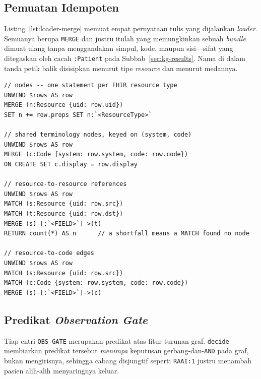 \subsection{Pemuatan Idempoten}
Listing~\ref{lst:loader-merge} memuat empat pernyataan tulis yang dijalankan
\emph{loader}. Semuanya berupa \texttt{MERGE} dan justru itulah yang memungkinkan sebuah
\emph{bundle} dimuat ulang tanpa menggandakan simpul, kode, maupun sisi---sifat yang
ditegaskan oleh cacah \texttt{:Patient} pada Subbab~\ref{sec:kg-results}. Nama di dalam
tanda petik balik disisipkan menurut tipe \emph{resource} dan menurut medannya.

\begin{lstlisting}[caption={Jalur tulis \emph{loader} (\texttt{loader.py}).},label={lst:loader-merge}]
// nodes -- one statement per FHIR resource type
UNWIND $rows AS row
MERGE (n:Resource {uid: row.uid})
SET n += row.props SET n:`<ResourceType>`

// shared terminology nodes, keyed on (system, code)
UNWIND $rows AS row
MERGE (c:Code {system: row.system, code: row.code})
ON CREATE SET c.display = row.display

// resource-to-resource references
UNWIND $rows AS row
MATCH (s:Resource {uid: row.src})
MATCH (t:Resource {uid: row.dst})
MERGE (s)-[:`<FIELD>`]->(t)
RETURN count(*) AS n      // a shortfall means a MATCH found no node

// resource-to-code edges
UNWIND $rows AS row
MATCH (s:Resource {uid: row.src})
MATCH (c:Code {system: row.system, code: row.code})
MERGE (s)-[:`<FIELD>`]->(c)
\end{lstlisting}

\subsection{Predikat \emph{Observation Gate}}
Tiap entri \texttt{OBS\_GATE} merupakan predikat atas fitur turunan graf. \texttt{decide}
membiarkan predikat tersebut \emph{menimpa} keputusan gerbang-dan-\texttt{AND} pada graf,
bukan mengirisnya, sehingga cabang disjungtif seperti \texttt{RAAI:1} justru menambah
pasien alih-alih menyaringnya keluar.

